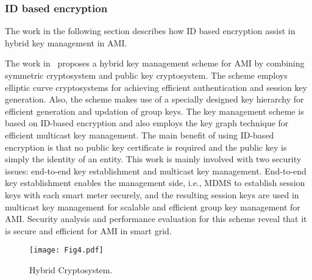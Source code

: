 \subsubsection{ID based encryption} The work in the following section describes how ID based encryption assist in hybrid key management in AMI.
\par The work in~\cite{Wan14} proposes a hybrid key management scheme for AMI by combining symmetric cryptosystem and public key cryptosystem. The scheme employs elliptic curve cryptosystems for achieving efficient authentication and session key generation. Also, the scheme makes use of a specially designed key hierarchy for efficient generation and updation of group keys. The key management scheme is based on ID-based encryption and also employs the key graph technique for efficient multicast key management. The main benefit of using ID-based encryption is that no public key certificate is required and the public key is simply the identity of an entity. This work is mainly involved with two security issues: end-to-end key establishment and multicast key management. End-to-end key establishment enables the management side, i.e., MDMS to establish session keys with each smart meter securely, and the resulting session keys are used in multicast key management for scalable and efficient group key management for AMI. Security analysis and performance evaluation for this scheme reveal that it is secure and efficient for AMI in smart grid.
\begin{figure}[b]
 \centering %
 \texttt{[image: Fig4.pdf]}
 \caption{Hybrid Cryptosystem.}
 \label{fig:Fig_4}
\end{figure}


